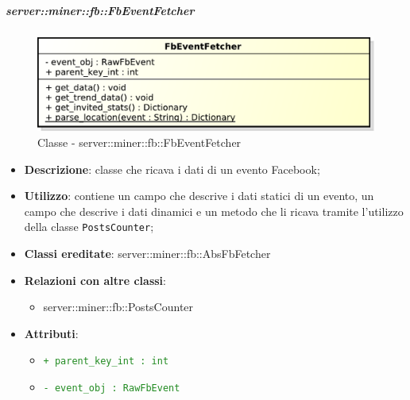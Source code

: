 		\subparagraph{server::miner::fb::FbEventFetcher} %
		\label{subp:server_miner_fb_FbEventFetcher}
		    \begin{figure}[!htbp]
 		 		\centering
 				\centerline{\includegraphics[scale=0.75]{./images/server/classes/miner/fb_event_fetcher.pdf}}
 				\caption{Classe - server::miner::fb::FbEventFetcher}
			\end{figure}
			\begin{itemize}
				\item \textbf{Descrizione}: classe che ricava i dati di un evento Facebook;
				\item \textbf{Utilizzo}: contiene un campo che descrive i dati statici di un evento, un campo che descrive i dati dinamici e un metodo che li ricava tramite l'utilizzo della classe \texttt{PostsCounter};
				\item \textbf{Classi ereditate}: server::miner::fb::AbsFbFetcher
				\item \textbf{Relazioni con altre classi}:
					\begin{itemize}
						\item server::miner::fb::PostsCounter
					\end{itemize}
				\item \textbf{Attributi}: 
					\begin{itemize}
						\item \textcolor{forestgreen}{\texttt{+ parent\_key\_int : int}}
						\item \textcolor{forestgreen}{\texttt{- event\_obj : RawFbEvent}}
					\end{itemize}

\end{itemize}
